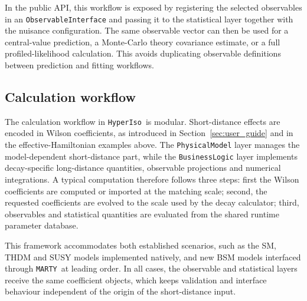 \documentclass[preprint,11pt]{elsarticle}
\newcommand{\hi}{\texttt{HyperIso}}
\newcommand{\mty}{\texttt{MARTY}}
\begin{document}
In the public API, this workflow is exposed by registering the selected observables in an \texttt{ObservableInterface} and passing it to the statistical layer together with the nuisance configuration.  The same observable vector can then be used for a central-value prediction, a Monte-Carlo theory covariance estimate, or a full profiled-likelihood calculation.  This avoids duplicating observable definitions between prediction and fitting workflows.



\subsection{Calculation workflow}

The calculation workflow in \hi~is modular.  Short-distance effects are encoded in Wilson coefficients, as introduced in Section~\ref{sec:user_guide} and in the effective-Hamiltonian examples above.  The \texttt{PhysicalModel} layer manages the model-dependent short-distance part, while the \texttt{BusinessLogic} layer implements decay-specific long-distance quantities, observable projections and numerical integrations.  A typical computation therefore follows three steps: first the Wilson coefficients are computed or imported at the matching scale; second, the requested coefficients are evolved to the scale used by the decay calculator; third, observables and statistical quantities are evaluated from the shared runtime parameter database.

This framework accommodates both established scenarios, such as the SM, THDM and SUSY models implemented natively, and new BSM models interfaced through \mty~at leading order.  In all cases, the observable and statistical layers receive the same coefficient objects, which keeps validation and interface behaviour independent of the origin of the short-distance input.
\end{document}
